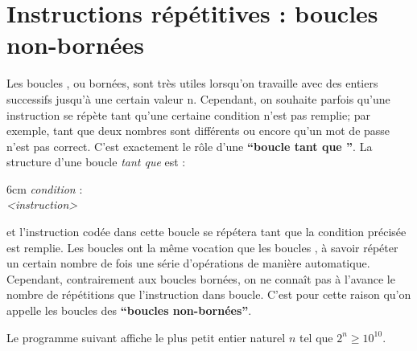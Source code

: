 \clearpage
\section{Instructions répétitives : boucles non-bornées}
%
Les boucles , ou bornées, sont très utiles lorsqu'on travaille avec des entiers successifs jusqu'à une certain valeur n. Cependant, on souhaite parfois qu'une instruction se répète tant qu'une certaine condition n'est pas remplie; par exemple, tant que deux nombres sont différents ou encore qu'un mot de passe n'est pas correct. C'est exactement le rôle d'une \textbf{``boucle tant que ''}. La structure d'une boucle \textit{tant que} est :
 
\vspace{-2mm}
\begin{center}
\begin{encadre}{6cm}
 {\it condition} : \\ \medskip
\hspace*{7mm} {\it <instruction>}
\end{encadre}
\end{center}

\smallskip
et l'instruction codée dans cette boucle se répétera tant que la condition précisée est remplie. Les boucles  ont la même vocation que les boucles , à savoir répéter un certain nombre de fois une série d'opérations de manière automatique. Cependant, contrairement aux boucles bornées, on ne connaît pas à l'avance le nombre de répétitions que l'instruction dans boucle. C'est pour cette raison qu'on appelle les boucles  des \textbf{``boucles non-bornées''}.


\bigskip
\begin{exemple}
Le programme suivant affiche le plus petit entier naturel $n$ tel que $2^n\geqslant 10^{10}$.
\begin{center}
\end{center}
\end{exemple}

